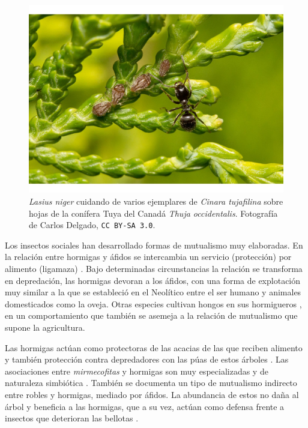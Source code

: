 \begin{figure}[h!]
\centering
\includegraphics[scale=1]{Figures/INTRO_Lasius_niger_y_Cinara_tujafilina_en_Thuja_occidentalis.jpg}
\caption{\textit{Lasius niger} cuidando de varios ejemplares de \textit{Cinara tujafilina} sobre hojas de la conífera Tuya del Canadá \textit{Thuja occidentalis}. Fotografía de Carlos Delgado, \small{\texttt{CC BY-SA 3.0}}.}
\label{fig:INTRO_Lasius_niger_y_Cinara_tujafilina_en_Thuja_occidentalis}
\end{figure}

Los insectos sociales han desarrollado formas de mutualismo muy elaboradas. En la relación entre hormigas y áfidos se intercambia un servicio (protección) por alimento (ligamaza) \cite{volkl1999ant}. Bajo determinadas circunstancias la relación se transforma en depredación, las hormigas devoran a los áfidos, con una forma de explotación muy similar a la que se estableció en el Neolítico entre el ser humano y animales domesticados como la oveja. Otras especies cultivan hongos en sus hormigueros \cite{mueller2001origin}, en un comportamiento que también se asemeja a la relación de mutualismo que supone la agricultura.

Las hormigas actúan como protectoras de las acacias de las que reciben alimento y también protección contra depredadores con las púas de estos árboles \cite{raine2002spatial}. Las asociaciones entre \textit{mirmecofitas} y hormigas son muy especializadas y de naturaleza simbiótica \cite{djieto2004symbiotic}. También se documenta un tipo de mutualismo indirecto entre robles y hormigas, mediado por áfidos. La abundancia de estos no daña al árbol y beneficia a las hormigas, que a su vez, actúan como defensa frente a insectos que deterioran las bellotas \cite{ito1991indirect}.


